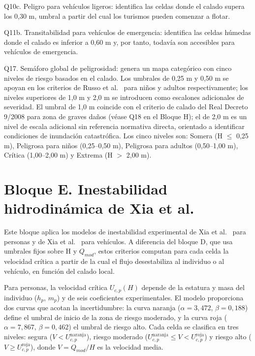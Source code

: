 Q10c. Peligro para vehículos ligeros: identifica las celdas donde el calado supera los 0,30 m, umbral a partir del cual los turismos pueden comenzar a flotar.

Q11b. Transitabilidad para vehículos de emergencia: identifica las celdas húmedas donde el calado es inferior a 0,60 m y, por tanto, todavía son accesibles para vehículos de emergencia.

Q17. Semáforo global de peligrosidad: genera un mapa categórico con cinco niveles de riesgo basados en el calado. Los umbrales de 0,25 m y 0,50 m se apoyan en los criterios de Russo et al.\ \cite{russo2013} para niños y adultos respectivamente; los niveles superiores de 1,0 m y 2,0 m se introducen como escalones adicionales de severidad. El umbral de 1,0 m coincide con el criterio de calado del Real Decreto 9/2008 \cite{rd9_2008} para zona de graves daños (véase Q18 en el Bloque H); el de 2,0 m es un nivel de escala adicional sin referencia normativa directa, orientado a identificar condiciones de inundación catastrófica. Los cinco niveles son: Somera (H $\leq$ 0,25 m), Peligrosa para niños (0,25--0,50 m), Peligrosa para adultos (0,50--1,00 m), Crítica (1,00--2,00 m) y Extrema (H $>$ 2,00 m).

\section{Bloque E. Inestabilidad hidrodinámica de Xia et al.}\label{bloque-e.-inestabilidad-xia}

Este bloque aplica los modelos de inestabilidad experimental de Xia et al.\ \cite{xia2014} para personas y de Xia et al.\ \cite{xia2011vehicles} para vehículos. A diferencia del bloque D, que usa umbrales fijos sobre H y $Q_{mod}$, estos criterios computan para cada celda la velocidad crítica a partir de la cual el flujo desestabiliza al individuo o al vehículo, en función del calado local.

Para personas, la velocidad crítica $U_{c,p}(H)$ depende de la estatura y masa del individuo ($h_p$, $m_p$) y de seis coeficientes experimentales. El modelo proporciona dos curvas que acotan la incertidumbre: la curva naranja ($\alpha = 3{,}472$, $\beta = 0{,}188$) define el umbral de inicio de la zona de riesgo moderado, y la curva roja ($\alpha = 7{,}867$, $\beta = 0{,}462$) el umbral de riesgo alto. Cada celda se clasifica en tres niveles: segura ($V < U_{c,p}^{\text{naranja}}$), riesgo moderado ($U_{c,p}^{\text{naranja}} \leq V < U_{c,p}^{\text{roja}}$) y riesgo alto ($V \geq U_{c,p}^{\text{roja}}$), donde $V = Q_{mod}/H$ es la velocidad media.

